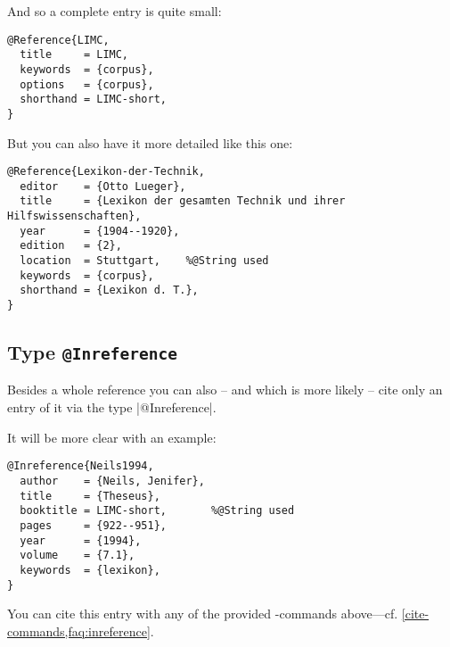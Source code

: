 \documentclass[a4paper,
10pt,
greek,
french,
spanish,
italian,
ngerman,
english
]{ltxdoc}
\begin{document}
And so a complete entry is quite small:
\begin{lstlisting}[style=bibentry,label=LIMC,caption={{@}Reference\{LIMC,…\} }]
@Reference{LIMC,
  title     = LIMC,
  keywords  = {corpus},
  options   = {corpus},
  shorthand = LIMC-short,
}
\end{lstlisting}
 
But you can also have it  more detailed  like this one:
\begin{lstlisting}[style=bibentry,label=Lexikon-der-Technik,caption={{@}Reference\{Lexikon-der-Technik,…\} }]
@Reference{Lexikon-der-Technik,
  editor    = {Otto Lueger},
  title     = {Lexikon der gesamten Technik und ihrer Hilfswissenschaften},
  year      = {1904--1920},
  edition   = {2},
  location  = Stuttgart, 	%@String used
  keywords  = {corpus},
  shorthand = {Lexikon d. T.},
}
\end{lstlisting}

 \subsection{Type \texttt{@Inreference}}\label{inreference}
Besides a whole reference you can also -- and which is more likely -- cite only an entry of it via the type  |@Inreference|.

It will be more clear with an example:
  \begin{lstlisting}[style=bibentry,label=Neils1994,caption={{@}Inreference\{Neils1994,…\} }]
@Inreference{Neils1994,
  author    = {Neils, Jenifer},
  title     = {Theseus},
  booktitle = LIMC-short,		%@String used
  pages     = {922--951},
  year      = {1994},
  volume    = {7.1},
  keywords  = {lexikon},
}
\end{lstlisting}
You can cite this entry with any of the provided -commands above---cf. \cref{cite-commands,faq:inreference}.
\end{document}
